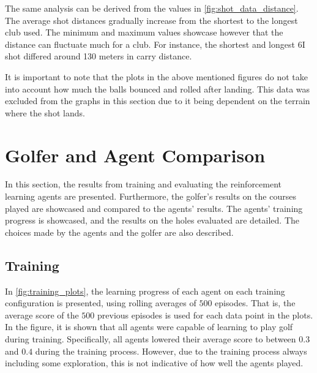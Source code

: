 \documentclass{kththesis}
\begin{document}
The same analysis can be derived from the values in \autoref{fig:shot_data_distance}. The average shot distances gradually increase from the shortest to the longest club used. The minimum and maximum values showcase however that the distance can fluctuate much for a club. For instance, the shortest and longest 6I shot differed around 130 meters in carry distance. 

It is important to note that the plots in the above mentioned figures do not take into account how much the balls bounced and rolled after landing. This data was excluded from the graphs in this section due to it being dependent on the terrain where the shot lands.

\section{Golfer and Agent Comparison}
In this section, the results from training and evaluating the reinforcement learning agents are presented. Furthermore, the golfer's results on the courses played are showcased and compared to the agents' results. The agents' training progress is showcased, and the results on the holes evaluated are detailed. The choices made by the agents and the golfer are also described.

\subsection{Training}
In \autoref{fig:training_plots}, the learning progress of each agent on each training configuration is presented, using rolling averages of $500$ episodes. That is, the average score of the $500$ previous episodes is used for each data point in the plots. In the figure, it is shown that all agents were capable of learning to play golf during training. Specifically, all agents lowered their average score to between $0.3$ and $0.4$ during the training process. However, due to the training process always including some exploration, this is not indicative of how well the agents played.
\end{document}
